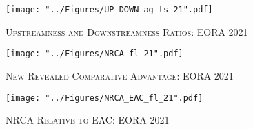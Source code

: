 \documentclass[a4paper]{article}
\begin{document}
\begin{figure}[h!] %
\centering
\caption{\label{fig:UP_DOWN_ag_ts_21}\textsc{Upstreamness and Downstreamness Ratios: EORA 2021}}
\texttt{[image: "../Figures/UP\_DOWN\_ag\_ts\_21".pdf]} %
\end{figure} 
\FloatBarrier 

\begin{figure}[h!]
\centering
\caption{\label{fig:NRCA_21}\textsc{New Revealed Comparative Advantage: EORA 2021}}
\texttt{[image: "../Figures/NRCA\_fl\_21".pdf]} %
\end{figure}
\FloatBarrier

\begin{figure}[h!]
\centering
\caption{\label{fig:NRCA_EAC_21}\textsc{NRCA Relative to EAC: EORA 2021}}
\texttt{[image: "../Figures/NRCA\_EAC\_fl\_21".pdf]} %
\vspace{-1cm}
\end{figure}
\FloatBarrier
\end{document}
